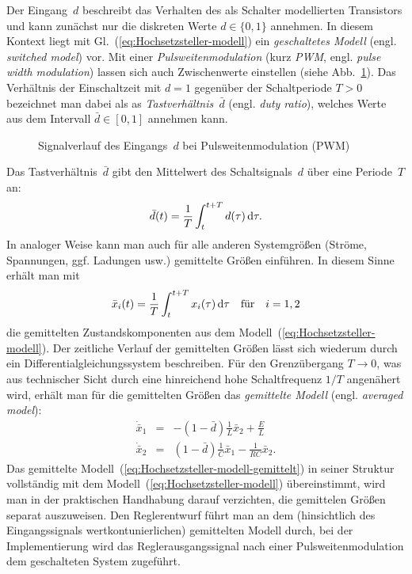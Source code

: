 Der Eingang~$d$ beschreibt das Verhalten des als Schalter modellierten
Transistors und kann zunächst nur die diskreten Werte $d\in\{0,1\}$
annehmen. In diesem Kontext liegt mit Gl.~(\ref{eq:Hochsetzsteller-modell})
ein \emph{geschaltetes Modell} (engl. \emph{switched model}) vor.
Mit einer \emph{Pulsweitenmodulation} (kurz \emph{PWM}, engl. \emph{pulse
width modulation}) lassen sich auch Zwischenwerte einstellen (siehe
Abb.~\ref{fig:PWM}). Das Verhältnis der Einschaltzeit mit $d=1$
gegenüber der Schaltperiode $T>0$ bezeichnet man dabei als as \emph{Tastverhältnis~}$\bar{d}$
(engl. \emph{duty ratio}), welches Werte aus dem Intervall $\bar{d}\in[0,1]$
annehmen kann.

\begin{figure}
\begin{centering}
\resizebox{0.55\textwidth}{!}{}
\par\end{centering}
\caption{Signalverlauf des Eingangs~$d$ bei Pulsweitenmodulation (PWM)\label{fig:PWM}}
\end{figure}

Das Tastverhältnis~$\bar{d}$ gibt den Mittelwert des Schaltsignals~$d$
über eine Periode~$T$ an:
\[
\bar{d}(t)=\frac{1}{T}\int_{t}^{t+T}d(\tau)\,{\mathrm{d}}\tau.
\]
In analoger Weise kann man auch für alle anderen Systemgrößen (Ströme,
Spannungen, ggf. Ladungen usw.) gemittelte Größen einführen. In diesem
Sinne erhält man mit 
\[
\bar{x}_{i}(t)=\frac{1}{T}\int_{t}^{t+T}x_{i}(\tau)\,{\mathrm{d}}\tau\quad\text{für}\quad i=1,2
\]
die gemittelten Zustandskomponenten aus dem Modell~(\ref{eq:Hochsetzsteller-modell}).
Der zeitliche Verlauf der gemittelten Größen lässt sich wiederum durch
ein Differentialgleichungssystem beschreiben. Für den Grenzübergang
$T\to0$, was aus technischer Sicht durch eine hinreichend hohe Schaltfrequenz
$1/T$ angenähert wird, erhält man für die gemittelten Größen das
\emph{gemittelte Modell} (engl. \emph{averaged model}):
\begin{equation}
\begin{array}{lcl}
\dot{\bar{x}}_{1} & = & -(1-\bar{d})\frac{1}{L}\bar{x}_{2}+\frac{E}{L}\\
\dot{\bar{x}}_{2} & = & (1-\bar{d})\frac{1}{C}\bar{x}_{1}-\frac{1}{RC}\bar{x}_{2}.
\end{array}\label{eq:Hochsetzsteller-modell-gemittelt}
\end{equation}
Das gemittelte Modell~(\ref{eq:Hochsetzsteller-modell-gemittelt})
in seiner Struktur vollständig mit dem Modell~(\ref{eq:Hochsetzsteller-modell})
übereinstimmt, wird man in der praktischen Handhabung darauf verzichten,
die gemittelen Größen separat auszuweisen. Den Reglerentwurf führt
man an dem (hinsichtlich des Eingangssignals wertkontunierlichen)
gemittelten Modell durch, bei der Implementierung wird das Reglerausgangssignal
nach einer Pulsweitenmodulation dem geschalteten System zugeführt.




